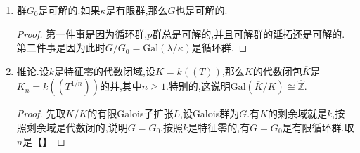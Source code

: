 \begin{enumerate}
\begin{proof}
		如果$s\ge1$,那么$U_L^{(s)}/U_L^{(s+1)}\cong\lambda$,这是一个特征零的加法群,它没有非平凡有限子群.而按照$\theta_s$是单射,迫使$G_s/G_{s+1}$是平凡群,于是$G_1=G_2=\cdots$,但是分歧群在指标足够大时平凡,就导致$G_1=\{e\}$.类似的$G_0/G_1$是循环群,就导致$G_0$是循环群.
	\end{proof}
	\item 群$G_0$是可解的.如果$\kappa$是有限群,那么$G$也是可解的.
	\begin{proof}
		
		第一件事是因为循环群,$p$群总是可解的,并且可解群的延拓还是可解的.第二件事是因为此时$G/G_0=\mathrm{Gal}(\lambda/\kappa)$是循环群.
	\end{proof}
	\item 推论.设$k$是特征零的代数闭域,设$K=k((T))$,那么$K$的代数闭包$\overline{K}$是$K_n=k((T^{1/n}))$的并,其中$n\ge1$.特别的,这说明$\mathrm{Gal}(\overline{K}/K)\cong\widehat{\mathbb{Z}}$.
	\begin{proof}
		
		先取$\overline{K}/K$的有限Galois子扩张$L$,设Galois群为$G$.有$K$的剩余域就是$k$,按照剩余域是代数闭的,说明$G=G_0$.按照$k$是特征零的,有$G=G_0$是有限循环群.取$n$是【】
	\end{proof}
\end{enumerate}

